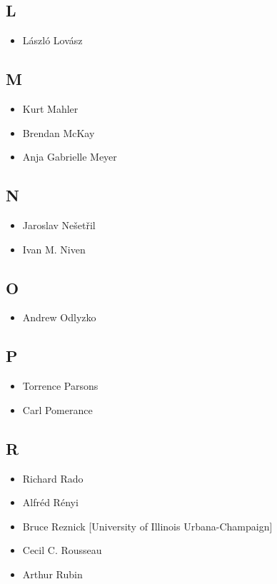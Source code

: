 \documentclass[12pt]{article}
\begin{document}
\subsection{L}
\begin{itemize}
\item L\'{a}szl\'{o} Lov\'asz
\end{itemize}

\subsection{M}
\begin{itemize}
\item Kurt Mahler
\item Brendan McKay
\item Anja Gabrielle Meyer
\end{itemize}

\subsection{N}
\begin{itemize}
\item Jaroslav Ne\v{s}et\v{r}il
\item Ivan M. Niven
\end{itemize}

\subsection{O}
\begin{itemize}
\item Andrew Odlyzko
\end{itemize}

\subsection{P}
\begin{itemize}
\item Torrence Parsons 
\item Carl Pomerance
\end{itemize}

\subsection{R}
\begin{itemize}
\item Richard Rado
\item Alfr\'{e}d R\'enyi
\item Bruce Reznick [University of Illinois Urbana-Champaign]
\item Cecil C. Rousseau
\item Arthur Rubin
\end{itemize}
\end{document}
